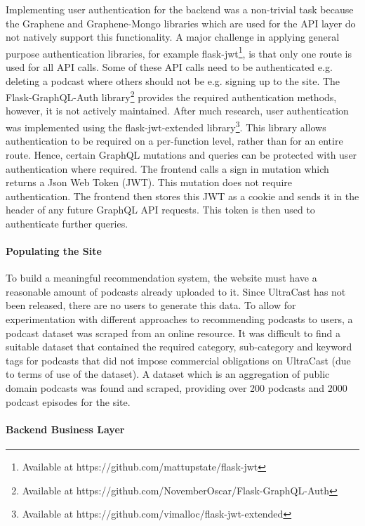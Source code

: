 \documentclass[../report.tex]{subfiles}
\begin{document}
Implementing user authentication for the backend was a non-trivial task because the Graphene and Graphene-Mongo libraries which are used for the API layer do not natively support this functionality.
A major challenge in applying general purpose authentication libraries, for example flask-jwt\footnote{Available at https://github.com/mattupstate/flask-jwt}, is that only one route is used for all API calls.
Some of these API calls need to be authenticated e.g. deleting a podcast where others should not be e.g. signing up to the site.
The Flask-GraphQL-Auth library\footnote{Available at https://github.com/NovemberOscar/Flask-GraphQL-Auth} provides the required authentication methods, however, it is not actively maintained.
After much research, user authentication was implemented using the flask-jwt-extended library\footnote{Available at https://github.com/vimalloc/flask-jwt-extended}.
This library allows authentication to be required on a per-function level, rather than for an entire route.
Hence, certain GraphQL mutations and queries can be protected with user authentication where required.
The frontend calls a sign in mutation which returns a Json Web Token (JWT).
This mutation does not require authentication.
The frontend then stores this JWT as a cookie and sends it in the header of any future GraphQL API requests.
This token is then used to authenticate further queries.

\paragraph{Populating the Site}

To build a meaningful recommendation system, the website must have a reasonable amount of podcasts already uploaded to it.
Since UltraCast has not been released, there are no users to generate this data.
To allow for experimentation with different approaches to recommending podcasts to users, a podcast dataset was scraped from an online resource.
It was difficult to find a suitable dataset that contained the required category, sub-category and keyword tags for podcasts that did not impose commercial obligations on UltraCast (due to terms of use of the dataset).
A dataset which is an aggregation of public domain podcasts was found and scraped, providing over 200 podcasts and 2000 podcast episodes for the site.

\paragraph{Backend Business Layer}
\end{document}
